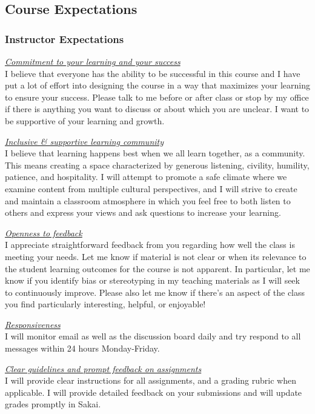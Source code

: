 \documentclass[
  letterpaper,
  DIV=11,
  numbers=noendperiod]{scrartcl}
\begin{document}
\subsection{Course Expectations}\label{course-expectations}

\subsubsection{Instructor Expectations}\label{instructor-expectations}

\ul{\emph{Commitment to your learning and your success\\
}}I believe that everyone has the ability to be successful in this
course and I have put a lot of effort into designing the course in a way
that maximizes your learning to ensure your success. Please talk to me
before or after class or stop by my office if there is anything you want
to discuss or about which you are unclear. I want to be supportive of
your learning and growth.

\ul{\emph{Inclusive \& supportive learning community}}\\
I believe that learning happens best when we all learn together, as a
community. This means creating a space characterized by generous
listening, civility, humility, patience, and hospitality. I will attempt
to promote a safe climate where we examine content from multiple
cultural perspectives, and I will strive to create and maintain a
classroom atmosphere in which you feel free to both listen to others and
express your views and ask questions to increase your learning.

\ul{\emph{Openness to feedback}}\\
I appreciate straightforward feedback from you regarding how well the
class is meeting your needs. Let me know if material is not clear or
when its relevance to the student learning outcomes for the course is
not apparent. In particular, let me know if you identify bias or
stereotyping in my teaching materials as I will seek to continuously
improve. Please also let me know if there's an aspect of the class you
find particularly interesting, helpful, or enjoyable!

\ul{\emph{Responsiveness\\
}}I will monitor email as well as the discussion board daily and try
respond to all messages within 24 hours Monday-Friday.

\ul{\emph{Clear guidelines and prompt feedback on assignments}}\\
I will provide clear instructions for all assignments, and a grading
rubric when applicable. I will provide detailed feedback on your
submissions and will update grades promptly in Sakai.
\end{document}
